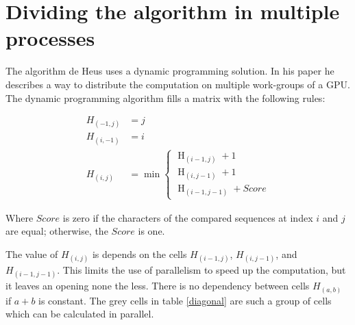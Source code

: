 \section{Dividing the algorithm in multiple processes}
The algorithm de Heus uses a dynamic programming solution\cite{Heus:GPGPU}.
In his paper he describes a way to distribute the computation on multiple work-groups of a GPU.
The dynamic programming algorithm fills a matrix with the following rules\cite{Jordan}:

\begin{equation} \label{eq1}
\begin{split}
H_{(-1,j)} & = j \\
H_{(i,-1)} & = i \\
H_{(i,j)} & = \min \begin{cases}
          \operatorname{H}_{(i-1,j)} + 1 \\
          \operatorname{H}_{(i,j-1)} + 1 \\
          \operatorname{H}_{(i-1,j-1)} + Score
\end{cases}
\end{split}
\end{equation}

Where $Score$ is zero if the characters of the compared sequences at index $i$ and $j$ are equal; otherwise, the $Score$ is one.

The value of $H_{(i,j)}$ is depends on the cells $H_{(i-1,j)}$, $H_{(i,j-1)}$, and $H_{(i-1,j-1)}$.
This limits the use of parallelism to speed up the computation, but it leaves an opening none the less.
There is no dependency between cells $H_{(a,b)}$ if $a + b$ is constant.
The grey cells in table \ref{diagonal} are such a group of cells which can be calculated in parallel.

